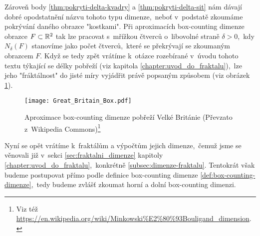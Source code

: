 Zároveň body \ref{thm:pokryti-delta-kvadry} a \ref{thm:pokryti-delta-sit} nám dávají dobré opodstatnění názvu tohoto typu dimenze,~neboť v~podstatě zkoumáme pokrývání daného obrazce "kostkami". Při aproximacích box-counting dimenze obrazce $F\subset\mathbb{R}^2$ tak lze pracovat s~mřížkou čtverců o~libovolné straně $\delta>0$,~kdy $N_\delta(F)$ stanovíme jako počet čtverců,~které se překrývají se zkoumaným obrazcem $F$. Když se tedy zpět vrátíme k~otázce rozebírané v~úvodu tohoto textu týkající se délky pobřeží (viz kapitola \ref{chapter:uvod_do_fraktalu}),~lze jeho "fráktálnost" do jisté míry vyjádřit právě popsaným způsobem (viz obrázek \ref{fig:aproximace-delky-pobrezi-vb}).
\begin{figure}
    \centering
    \texttt{[image: Great\_Britain\_Box.pdf]}
    \caption[Aproximace box-counting dimenze pobřeží Velké Británie]{Aproximace box-counting dimenze pobřeží Velké Británie (Převzato z~Wikipedia Commons)\footnote{Viz též \url{https://en.wikipedia.org/wiki/Minkowski\%E2\%80\%93Bouligand\_dimension}.}}
    \label{fig:aproximace-delky-pobrezi-vb}
\end{figure}
Nyní se opět vrátíme k~fraktálům a výpočtům jejich dimenze,~čemuž jsme se věnovali již v~sekci \ref{sec:fraktalni_dimenze} kapitoly \ref{chapter:uvod_do_fraktalu},~konkrétně \ref{subsec:dimenze-fraktalu}. Tentokrát však budeme postupovat přímo podle definice box-counting dimenze \ref{def:box-counting-dimenze},~tedy budeme zvlášť zkoumat horní a dolní box-counting dimenzi.
